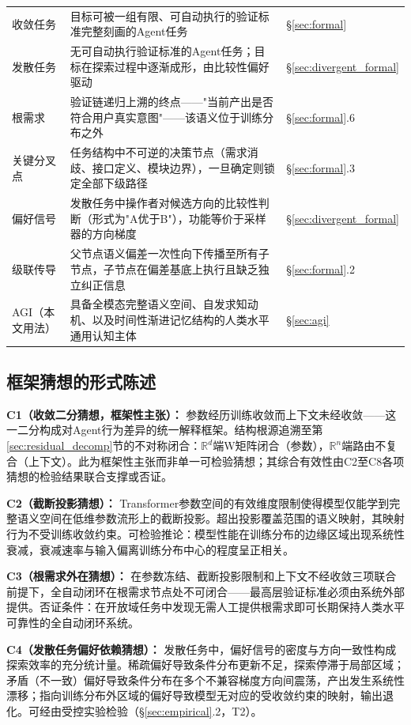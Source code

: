 \documentclass[11pt,a4paper]{article}
\theoremstyle{definition}
\begin{document}
\begin{table}[H]
\begin{tabular}{@{}p{2.5cm}p{5.5cm}p{4cm}@{}}
收敛任务 & 目标可被一组有限、可自动执行的验证标准完整刻画的Agent任务 & \S\ref{sec:formal} \\
发散任务 & 无可自动执行验证标准的Agent任务；目标在探索过程中逐渐成形，由比较性偏好驱动 & \S\ref{sec:divergent_formal} \\
根需求 & 验证链递归上溯的终点——"当前产出是否符合用户真实意图"——该语义位于训练分布之外 & \S\ref{sec:formal}.6 \\
关键分叉点 & 任务结构中不可逆的决策节点（需求消歧、接口定义、模块边界），一旦确定则锁定全部下级路径 & \S\ref{sec:formal}.3 \\
偏好信号 & 发散任务中操作者对候选方向的比较性判断（形式为"A优于B"），功能等价于采样器的方向梯度 & \S\ref{sec:divergent_formal} \\
级联传导 & 父节点语义偏差一次性向下传播至所有子节点，子节点在偏差基底上执行且缺乏独立纠正信息 & \S\ref{sec:formal}.2 \\
AGI（本文用法） & 具备全模态完整语义空间、自发求知动机、以及时间性渐进记忆结构的人类水平通用认知主体 & \S\ref{sec:agi} \\
\bottomrule
\end{tabular}
\end{table}

\subsection{框架猜想的形式陈述}

\textbf{C1（收敛二分猜想，框架性主张）：}
参数经历训练收敛而上下文未经收敛——这一二分构成对Agent行为差异的统一解释框架。结构根源追溯至第\ref{sec:residual_decomp}节的不对称闭合：$\mathbb{R}^d$端W矩阵闭合（参数），$\mathbb{R}^n$端路由不复合（上下文）。此为框架性主张而非单一可检验猜想；其综合有效性由C2至C8各项猜想的检验结果联合支撑或否证。

\textbf{C2（截断投影猜想）：}
Transformer参数空间的有效维度限制使得模型仅能学到完整语义空间在低维参数流形上的截断投影。超出投影覆盖范围的语义映射，其映射行为不受训练收敛约束。可检验推论：模型性能在训练分布的边缘区域出现系统性衰减，衰减速率与输入偏离训练分布中心的程度呈正相关。

\textbf{C3（根需求外在猜想）：}
在参数冻结、截断投影限制和上下文不经收敛三项联合前提下，全自动闭环在根需求节点处不可闭合——最高层验证标准必须由系统外部提供。否证条件：在开放域任务中发现无需人工提供根需求即可长期保持人类水平可靠性的全自动闭环系统。

\textbf{C4（发散任务偏好依赖猜想）：}
发散任务中，偏好信号的密度与方向一致性构成探索效率的充分统计量。稀疏偏好导致条件分布更新不足，探索停滞于局部区域；矛盾（不一致）偏好导致条件分布在多个不兼容梯度方向间震荡，产出发生系统性漂移；指向训练分布外区域的偏好导致模型无对应的受收敛约束的映射，输出退化。可经由受控实验检验（\S\ref{sec:empirical}.2，T2）。
\end{document}

